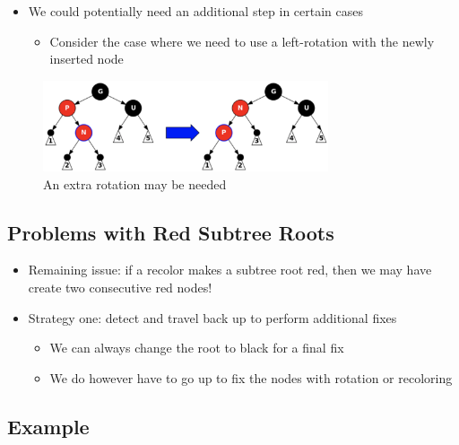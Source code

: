 \documentclass[
  10pt,
  english,
  letterpaper,
,tablecaptionabove
]{scrartcl}
\providecommand{\tightlist}{%
  \setlength{\itemsep}{0pt}\setlength{\parskip}{0pt}}
\begin{document}
\begin{itemize}
\tightlist
\item
  We could potentially need an additional step in certain cases

  \begin{itemize}
  \tightlist
  \item
    Consider the case where we need to use a left-rotation with the
    newly inserted node
  \end{itemize}
\end{itemize}

\begin{figure}
\centering
\includegraphics[width=0.75\textwidth,height=\textheight]{images/3.png}
\caption{An extra rotation may be needed}
\end{figure}

\hypertarget{problems-with-red-subtree-roots}{%
\subsection{Problems with Red Subtree
Roots}\label{problems-with-red-subtree-roots}}

\begin{itemize}
\tightlist
\item
  Remaining issue: if a recolor makes a subtree root red, then we may
  have create two consecutive red nodes!
\item
  Strategy one: detect and travel back up to perform additional fixes

  \begin{itemize}
  \tightlist
  \item
    We can always change the root to black for a final fix
  \item
    We do however have to go up to fix the nodes with rotation or
    recoloring
  \end{itemize}
\end{itemize}

\hypertarget{example}{%
\subsection{Example}\label{example}}
\end{document}
